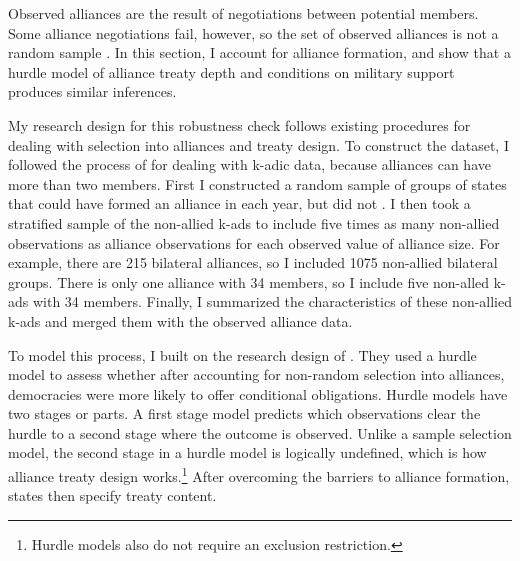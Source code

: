 \documentclass[12pt]{article}
\begin{document}
Observed alliances are the result of negotiations between potential members. 
Some alliance negotiations fail, however, so the set of observed alliances is not a random sample \citep{Poast2019a}. 
In this section, I account for alliance formation, and show that a hurdle model of alliance treaty depth and conditions on military support produces similar inferences. 


My research design for this robustness check follows existing procedures for dealing with selection into alliances and treaty design. 
To construct the dataset, I followed the process of \citet{Poast2010} for dealing with k-adic data, because alliances can have more than two members. 
First I constructed a random sample of groups of states that could have formed an alliance in each year, but did not \citep{FordhamPoast2014}.
I then took a stratified sample of the non-allied k-ads to include five times as many non-allied observations as alliance observations for each observed value of alliance size. 
For example, there are 215 bilateral alliances, so I included 1075 non-allied bilateral groups. 
There is only one alliance with 34 members, so I include five non-alled k-ads with 34 members. 
Finally, I summarized the characteristics of these non-allied k-ads and merged them with the observed alliance data. 


To model this process, I built on the research design of \citet{Chibaetal2015}. 
They used a hurdle model to assess whether after accounting for non-random selection into alliances, democracies were more likely to offer conditional obligations.
Hurdle models have two stages or parts.
A first stage model predicts which observations clear the hurdle to a second stage where the outcome is observed. 
Unlike a sample selection model, the second stage in a hurdle model is logically undefined, which is how alliance treaty design works.\footnote{Hurdle models also do not require an exclusion restriction.} 
After overcoming the barriers to alliance formation, states then specify treaty content. 
\end{document}
